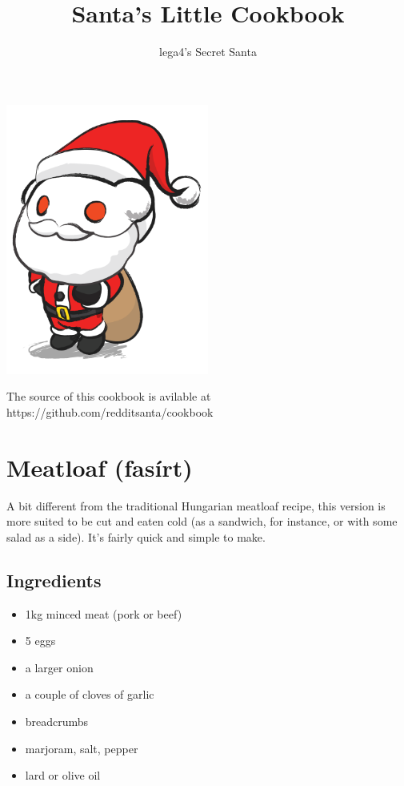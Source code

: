 \documentclass{article}
\title{Santa's Little Cookbook}
\author{lega4's Secret Santa}
\begin{document}
\maketitle

\begin{center}
\vspace{1cm}

\vspace{2cm}

\includegraphics[width=0.5\textwidth]{logo}

The source of this cookbook is avilable at
\\
https://github.com/redditsanta/cookbook
\end{center}


\newpage
\section{Meatloaf (fasírt)}

A bit different from the traditional Hungarian meatloaf recipe, this version is more suited to be cut and eaten cold (as a sandwich, for instance, or with some salad as a side). It's fairly quick and simple to make. 

\subsection{Ingredients}
\begin{itemize}
    \item 1kg minced meat (pork or beef)
    \item 5 eggs
    \item a larger onion
    \item a couple of cloves of garlic
    \item breadcrumbs
    \item marjoram, salt, pepper
    \item lard or olive oil
\end{itemize}
\end{document}

